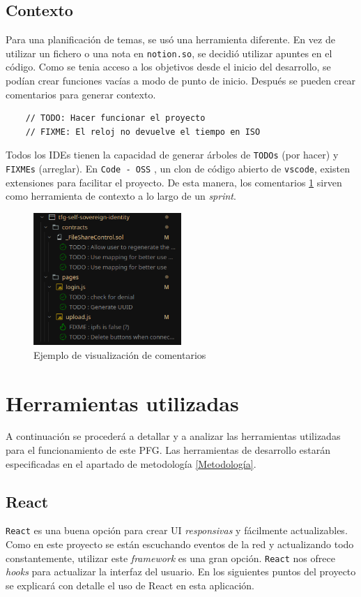 \subsection{Contexto}
Para una planificación de temas, se usó una herramienta diferente. En vez de utilizar un fichero o una nota en \verb|notion.so|, se decidió utilizar apuntes en el código. Como se tenia acceso a los objetivos desde el inicio del desarrollo, se podían crear funciones vacías a modo de punto de inicio. Después se pueden crear comentarios para generar contexto.
\begin{lstlisting}
    // TODO: Hacer funcionar el proyecto
    // FIXME: El reloj no devuelve el tiempo en ISO
\end{lstlisting}
Todos los IDEs tienen la capacidad de generar árboles de \verb|TODOs| (por hacer) y \verb|FIXMEs| (arreglar). En \verb|Code - OSS| \cite{web:code-oss}, un clon de código abierto de \verb|vscode|, existen extensiones para facilitar el proyecto.
De esta manera, los comentarios \ref{fg:todoTree} sirven como herramienta de contexto a lo largo de un \textit{sprint}.
\begin{figure}[H]
    \centering
    \includegraphics[width=0.5\textwidth]{Figures/TodoTree.png}
    \caption{Ejemplo de visualización de comentarios}
    \label{fg:todoTree}
\end{figure}
\section{Herramientas utilizadas}
A continuación se procederá a detallar y a analizar las herramientas utilizadas para el funcionamiento de este PFG. Las herramientas de desarrollo estarán especificadas en el apartado de metodología \ref{Metodología}.
\subsection{React}
\verb|React| es una buena opción para crear UI \textit{responsivas} y fácilmente actualizables. Como en este proyecto se están escuchando eventos de la red y actualizando todo constantemente, utilizar este \textit{framework} es una gran opción. \verb|React| nos ofrece \textit{hooks} para actualizar la interfaz del usuario. 
En los siguientes puntos del proyecto se explicará con detalle el uso de React en esta aplicación.
